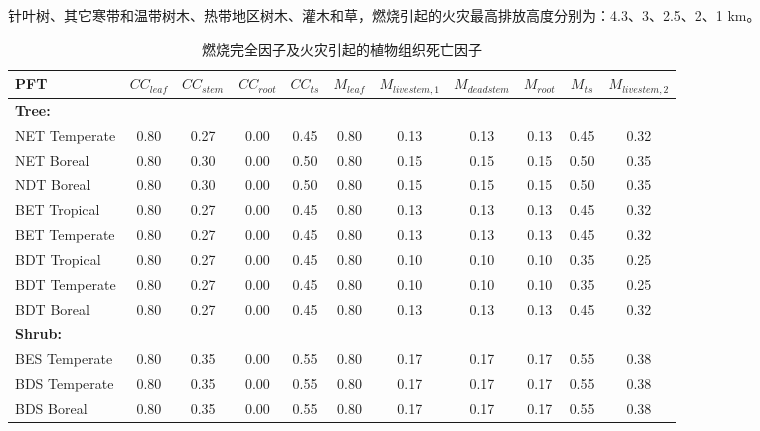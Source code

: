针叶树、其它寒带和温带树木、热带地区树木、灌木和草，燃烧引起的火灾最高排放高度分别为：4.3、3、2.5、2、1 km。

\begin{landscape}
\begin{table}[htbp]
\caption{燃烧完全因子及火灾引起的植物组织死亡因子}
\label{tab:burning_factors}
\begin{tabular}{lcccccccccc}
\toprule
PFT              & $CC_{leaf}$ & $CC_{stem}$ & $CC_{root}$ & $CC_{ts}$ & $M_{leaf}$ & $M_{livestem,1}$ & $M_{deadstem}$ & $M_{root}$ & $M_{ts}$  & $M_{livestem,2}$ \\ \midrule
\multicolumn{11}{l}{\textbf{Tree:}}                                                                                        \\
NET Temperate    & 0.80   & 0.27   & 0.00   & 0.45 & 0.80  & 0.13        & 0.13      & 0.13  & 0.45 & 0.32        \\
NET Boreal       & 0.80   & 0.30   & 0.00   & 0.50 & 0.80  & 0.15        & 0.15      & 0.15  & 0.50 & 0.35        \\
NDT Boreal       & 0.80   & 0.30   & 0.00   & 0.50 & 0.80  & 0.15        & 0.15      & 0.15  & 0.50 & 0.35        \\
BET Tropical     & 0.80   & 0.27   & 0.00   & 0.45 & 0.80  & 0.13        & 0.13      & 0.13  & 0.45 & 0.32        \\
BET Temperate    & 0.80   & 0.27   & 0.00   & 0.45 & 0.80  & 0.13        & 0.13      & 0.13  & 0.45 & 0.32        \\
BDT Tropical     & 0.80   & 0.27   & 0.00   & 0.45 & 0.80  & 0.10        & 0.10      & 0.10  & 0.35 & 0.25        \\
BDT Temperate    & 0.80   & 0.27   & 0.00   & 0.45 & 0.80  & 0.10        & 0.10      & 0.10  & 0.35 & 0.25        \\
BDT Boreal       & 0.80   & 0.27   & 0.00   & 0.45 & 0.80  & 0.13        & 0.13      & 0.13  & 0.45 & 0.32        \\\hline
\multicolumn{11}{l}{\textbf{Shrub:}}                                                                                       \\
BES Temperate    & 0.80   & 0.35   & 0.00   & 0.55 & 0.80  & 0.17        & 0.17      & 0.17  & 0.55 & 0.38        \\
BDS Temperate    & 0.80   & 0.35   & 0.00   & 0.55 & 0.80  & 0.17        & 0.17      & 0.17  & 0.55 & 0.38        \\
BDS Boreal       & 0.80   & 0.35   & 0.00   & 0.55 & 0.80  & 0.17        & 0.17      & 0.17  & 0.55 & 0.38        \\\hline

\end{tabular}
\end{table}
\end{landscape}
